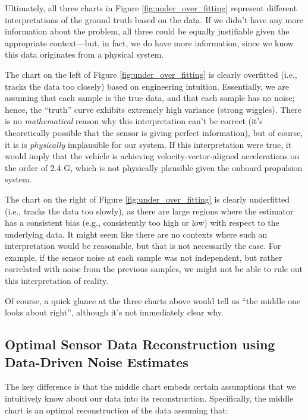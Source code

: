 Ultimately, all three charts in Figure \ref{fig:under_over_fitting} represent different interpretations of the ground truth based on the data. If we didn't have any more information about the problem, all three could be equally justifiable given the appropriate context—but, in fact, we do have more information, since we know this data originates from a physical system.

The chart on the left of Figure \ref{fig:under_over_fitting} is clearly overfitted (i.e., tracks the data too closely) based on engineering intuition. Essentially, we are assuming that each sample is the true data, and that each sample has no noise; hence, the ``truth'' curve exhibits extremely high variance (strong wiggles). There is no \emph{mathematical} reason why this interpretation can't be correct (it's theoretically possible that the sensor is giving perfect information), but of course, it is is \emph{physically} implausible for our system. If this interpretation were true, it would imply that the vehicle is achieving velocity-vector-aligned accelerations on the order of 2.4 G, which is not physically plausible given the onboard propulsion system.

The chart on the right of Figure \ref{fig:under_over_fitting} is clearly underfitted (i.e., tracks the data too slowly), as there are large regions where the estimator has a consistent bias (e.g., consistently too high or low) with respect to the underlying data. It might seem like there are no contexts where such an interpretation would be reasonable, but that is not necessarily the case. For example, if the sensor noise at each sample was not independent, but rather correlated with noise from the previous samples, we might not be able to rule out this interpretation of reality.

Of course, a quick glance at the three charts above would tell us ``the middle one looks about right'', although it's not immediately clear why.

\subsection{Optimal Sensor Data Reconstruction using Data-Driven Noise Estimates}
\label{subsec:optimal_sensor_data_reconstruction}

The key difference is that the middle chart embeds certain assumptions that we intuitively know about our data into its reconstruction. Specifically, the middle chart is an optimal reconstruction of the data assuming that:

